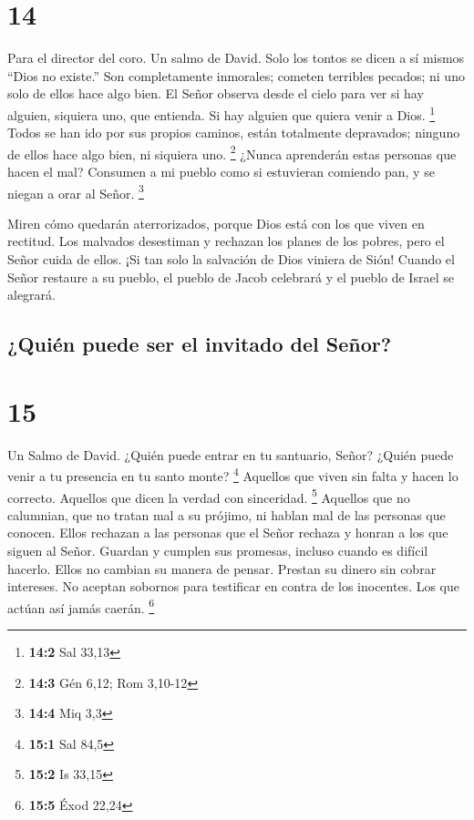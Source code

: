 \hypertarget{section-13}{%
\section{14}\label{section-13}}

Para el director del coro. Un salmo de David.  Solo los
tontos se dicen a sí mismos ``Dios no existe.'' Son completamente
inmorales; cometen terribles pecados; ni uno solo de ellos hace algo
bien.  El Señor observa desde el cielo para ver si hay
alguien, siquiera uno, que entienda. Si hay alguien que quiera venir a
Dios. \footnote{\textbf{14:2} Sal 33,13}  Todos se han ido
por sus propios caminos, están totalmente depravados; ninguno de ellos
hace algo bien, ni siquiera uno. \footnote{\textbf{14:3} Gén 6,12; Rom
  3,10-12}  ¿Nunca aprenderán estas personas que hacen el
mal? Consumen a mi pueblo como si estuvieran comiendo pan, y se niegan a
orar al Señor. \footnote{\textbf{14:4} Miq 3,3}

 Miren cómo quedarán aterrorizados, porque Dios está con los
que viven en rectitud.  Los malvados desestiman y rechazan
los planes de los pobres, pero el Señor cuida de ellos.  ¡Si
tan solo la salvación de Dios viniera de Sión! Cuando el Señor restaure
a su pueblo, el pueblo de Jacob celebrará y el pueblo de Israel se
alegrará.

\hypertarget{quiuxe9n-puede-ser-el-invitado-del-seuxf1or}{%
\subsection{¿Quién puede ser el invitado del
Señor?}\label{quiuxe9n-puede-ser-el-invitado-del-seuxf1or}}

\hypertarget{section-14}{%
\section{15}\label{section-14}}

Un Salmo de David.  ¿Quién puede entrar en tu santuario,
Señor? ¿Quién puede venir a tu presencia en tu santo monte? \footnote{\textbf{15:1}
  Sal 84,5}  Aquellos que viven sin falta y hacen lo
correcto. Aquellos que dicen la verdad con sinceridad. \footnote{\textbf{15:2}
  Is 33,15}  Aquellos que no calumnian, que no tratan mal a
su prójimo, ni hablan mal de las personas que conocen. 
Ellos rechazan a las personas que el Señor rechaza y honran a los que
siguen al Señor. Guardan y cumplen sus promesas, incluso cuando es
difícil hacerlo. Ellos no cambian su manera de pensar. 
Prestan su dinero sin cobrar intereses. No aceptan sobornos para
testificar en contra de los inocentes. Los que actúan así jamás caerán.
\footnote{\textbf{15:5} Éxod 22,24}

